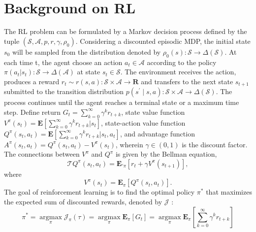 \clearpage
\section{Background on RL}
\label{app: background on RL}

 The RL problem can be formulated by a Markov decision process \citep[MDP]{howard1960dynamic} defined by the tuple  $\left(\mathcal{S}, \mathcal{A}, p, r, \gamma, \rho_{0}\right)$. 
 Considering a discounted episodic MDP, the initial state $s_0$ will be sampled from the distribution denoted by $\rho_0(s): \mathcal{S} \rightarrow \Delta(\mathcal{S})$. 
 At each time t, the agent choose an action $a_t \in \mathcal{A}$ according to the policy $\pi(a_t|s_t): \mathcal{S} \rightarrow \Delta(\mathcal{A})$ at state $s_t \in \mathcal{S}$. 
 The environment receives the action, produces a reward $r_t \sim r(s,a): \mathcal{S} \times \mathcal{A} \rightarrow \mathbf{R}$ and transfers to the next state $s_{t+1}$  submitted to the transition distribution $p\left(s^{\prime} \mid s, a\right): \mathcal{S} \times \mathcal{A} \rightarrow \Delta(\mathcal{S})$. 
 The process continues until the agent reaches a terminal state or a maximum time step. 
 Define return $G_t = \sum_{k=0}^\infty \gamma^k r_{t+k}$, state value function $V^{\pi}(s_t) = \textbf{E}\left[ \sum_{k=0}^\infty \gamma^k r_{t+k} | s_t \right]$, state-action value function $Q^{\pi}(s_t, a_t) = \textbf{E}\left[ \sum_{k=0}^\infty \gamma^k r_{t+k} | s_t, a_t \right]$, and advantage function $A^{\pi}(s_t,a_t) = Q^{\pi}(s_t, a_t) - V^{\pi}(s_t)$, wherein $\gamma \in(0,1)$ is the discount factor.
The connections between $V^\pi$ and $Q^\pi$ is given by the Bellman equation,
\begin{equation*}
    \mathcal{T}Q^{\pi} (s_t, a_t) = \textbf{E}_{'\pi} [r_t + \gamma V^{\pi}(s_{t+1})],
\end{equation*}
where
\begin{equation*}
    V^{\pi} (s_t)  = \textbf{E}_{\pi} [Q^{\pi} (s_t, a_t)].
\end{equation*}
The goal of reinforcement learning is to find the optimal policy $\pi^*$ that maximizes the expected sum of discounted rewards, denoted by $\mathcal{J}$ \citep{sutton}:
\begin{equation*}
\pi^{*}=\underset{\pi}{\operatorname{argmax}} \mathcal{J}_{\pi}(\tau) = \underset{\pi}{\operatorname{argmax}} \textbf{E}_{\pi}\left[G_{t}\right]= \underset{\pi}{\operatorname{argmax}} \textbf{E}_{\pi}[\sum_{k=0}^{\infty} \gamma^{k} r_{t+k}]
\end{equation*}



